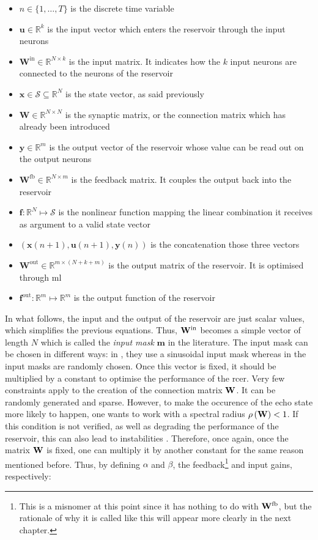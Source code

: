 \begin{itemize}
	\item $n \in \{1, \dots, T\}$ is the discrete time variable
	\item $\mathbf{u} \in \mathbb{R}^k$ is the input vector which enters the reservoir through the input neurons
	\item $\mathbf{W}^{\text{in}} \in \mathbb{R}^{N \times k}$ is the input matrix. It indicates how the $k$ input neurons are connected to the neurons of the reservoir
	\item $\mathbf{x} \in \mathcal{S} \subseteq \mathbb{R}^{N}$ is the state vector, as said previously
	\item $\mathbf{W} \in \mathbb{R}^{N \times N}$ is the synaptic matrix, or the connection matrix which has already been introduced
	\item $\mathbf{y} \in \mathbb{R}^{m}$ is the output vector of the reservoir whose value can be read out on the output neurons
	\item $\mathbf{W}^{\text{fb}} \in \mathbb{R}^{N \times m}$ is the feedback matrix. It couples the output back into the reservoir
	\item $\mathbf{f}: \mathbb{R}^N \mapsto \mathcal{S}$ is the nonlinear function mapping the linear combination it receives as argument to a valid state vector
	\item $\left(\mathbf{x}(n+1), \mathbf{u}(n+1), \mathbf{y}(n)\right)$ is the concatenation those three vectors
	\item $\mathbf{W}^{\text{out}} \in \mathbb{R}^{m \times (N+k+m)}$ is the output matrix of the reservoir. It is optimised through \gls{ml}
	\item $\mathbf{f}^{\text{out}} : \mathbb{R}^{m} \mapsto \mathbb{R}^{m}$ is the output function of the reservoir
\end{itemize}

In what follows, the input and the output of the reservoir are just scalar values, which simplifies the previous equations. Thus, $\mathbf{W}^{\text{in}}$ becomes a simple vector of length $N$ which is called the \textit{input mask} $\mathbf{m}$ in the literature. The input mask can be chosen in different ways: in \cite{Duport2016}, they use a sinusoidal input mask whereas in \cite{Antonik2017, Vinckier2015, Paquot2012} the input masks are randomly chosen. Once this vector is fixed, it should be multiplied by a constant to optimise the performance of the \gls{rcer}. Very few constraints apply to the creation of the connection matrix $\mathbf{W}$. It can be randomly generated and sparse. However, to make the occurence of the echo state more likely to happen, one wants to work with a spectral radius $\rho \left( \mathbf{W} \right)<1$. If this condition is not verified, as well as degrading the performance of the reservoir, this can also lead to instabilities \cite{Lukoeviius2009}. Therefore, once again, once the matrix $\mathbf{W}$ is fixed, one can multiply it by another constant for the same reason mentioned before. Thus, by defining $\alpha$ and $\beta$,  the feedback\footnote{This is a misnomer at this point since it has nothing to do with $\mathbf{W}^{\text{fb}}$, but the rationale of why it is called like this will appear more clearly in the next chapter.} and input gains, respectively:

